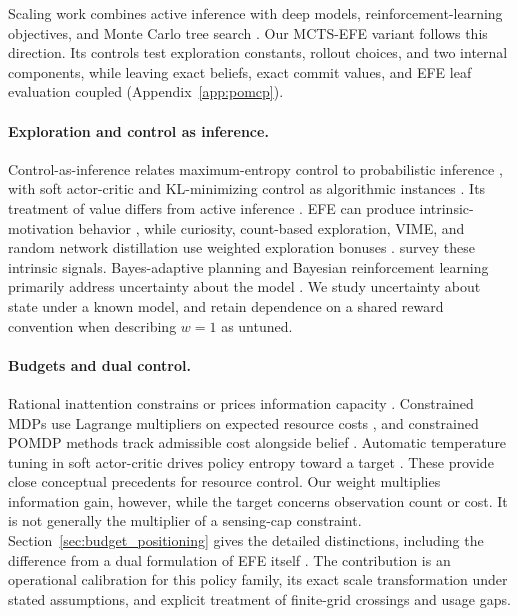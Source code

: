 Scaling work combines active inference with deep models, reinforcement-learning objectives, and Monte Carlo tree search \citep{fountas2020,tschantz2020,maisto2025}. Our MCTS-EFE variant follows this direction. Its controls test exploration constants, rollout choices, and two internal components, while leaving exact beliefs, exact commit values, and EFE leaf evaluation coupled (Appendix~\ref{app:pomcp}).

\paragraph{Exploration and control as inference.}
Control-as-inference relates maximum-entropy control to probabilistic inference \citep{todorov2007,levine2018}, with soft actor-critic and KL-minimizing control as algorithmic instances \citep{haarnoja2018,rawlik2012}. Its treatment of value differs from active inference \citep{millidge2020}. EFE can produce intrinsic-motivation behavior \citep{sajid2021}, while curiosity, count-based exploration, VIME, and random network distillation use weighted exploration bonuses \citep{schmidhuber1991,pathak2017,bellemare2016,houthooft2016,burda2019}. \citet{oudeyer2007} survey these intrinsic signals. Bayes-adaptive planning and Bayesian reinforcement learning primarily address uncertainty about the model \citep{duff2002,guez2013,ghavamzadeh2015}. We study uncertainty about state under a known model, and retain dependence on a shared reward convention when describing $w=1$ as untuned.

\paragraph{Budgets and dual control.}
Rational inattention constrains or prices information capacity \citep{sims2003,matejka2015}. Constrained MDPs use Lagrange multipliers on expected resource costs \citep{altman1999}, and constrained POMDP methods track admissible cost alongside belief \citep{kim2011cpomdp}. Automatic temperature tuning in soft actor-critic drives policy entropy toward a target \citep{haarnoja2018sac}. These provide close conceptual precedents for resource control. Our weight multiplies information gain, however, while the target concerns observation count or cost. It is not generally the multiplier of a sensing-cap constraint. Section~\ref{sec:budget_positioning} gives the detailed distinctions, including the difference from a dual formulation of EFE itself \citep{kouw2026bethe}. The contribution is an operational calibration for this policy family, its exact scale transformation under stated assumptions, and explicit treatment of finite-grid crossings and usage gaps.

